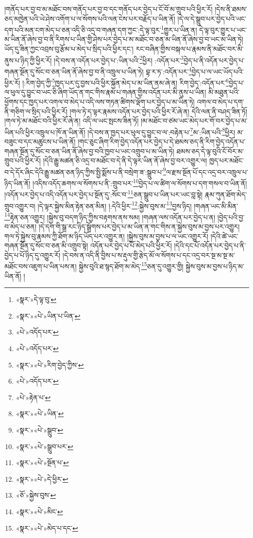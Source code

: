 །གནོད་པར་བྱ་བ་མ་མཐོང་བས་གནོད་པར་བྱ་བ་དང་གནོད་པར་བྱེད་པ་ངོ་བོ་མ་གྲུབ་པའི་ཕྱིར་རོ། །དེས་ནི་ཐམས་ཅད་མཁྱེན་པའི་ཡེ་ཤེས་འགོག་པ་ལ་སོགས་པའི་ལན་ངེས་པར་བརྗོད་པ་ཡིན་ནོ། །དེ་ལ་དེ་སྒྲུབ་པར་བྱེད་པའི་ཡང་དག་པའི་མན་ངག་མེད་པ་ཅན་འདི་ཅི་འདྲ་བ་གཞན་དག་ཀྱང་:དེ་ལྟ་བུར་\footnote{«སྣར་»དེ་ལྟ་བུ་}གྱུར་པ་ཡིན་ན། དེ་ལྟ་བུར་གྱུར་པ་ཡང་མ་ཡིན་ནོ་ཞེས་བྱ་བ་ནི་རིགས་པ་ཡིན་གྱི་ཤེས་པར་བྱེད་པ་མ་མཐོང་བ་ཅན་མ་ཡིན་ནོ་ཞེས་བྱ་བ་ཡང་མ་ཡིན་ཏེ། ཡོད་དུ་ཟིན་ཀྱང་འབྲས་བུ་རྩོམ་པ་མེད་པ་སྲིད་པའི་ཕྱིར་དང་། རང་བཞིན་གྱིས་བསྐལ་པ་རྣམས་ནི་མཐོང་བར་མི་ནུས་པ་ཉིད་ཀྱི་ཕྱིར་རོ། །དེ་བས་ན་འདོན་པར་བྱེད་པ་:ཡིན་པའི་\footnote{«སྣར་»«པེ་»ཡིན་པ་ཡིན་}ཕྱིར། :འདོན་པར་\footnote{«པེ་»འདོད་པར་}བྱེད་པ་ནི་འདོན་པར་བྱེད་པ་གཞན་སྔོན་དུ་སོང་བ་ཅན་ཡིན་ནོ་ཞེས་བྱ་བ་ནི་འཁྲུལ་པ་ཡིན་ཏེ། བྷ་ར་ཏ་:འདོན་པར་\footnote{«པེ་»འདོད་པར་}བྱེད་པ་ལ་ཡང་ཡོད་པའི་ཕྱིར་རོ། །:རིག་བྱེད་ཀྱི་\footnote{«སྣར་»«པེ་»རིག་བྱེད་ཀྱིས་}ཁྱད་པར་དུ་བྱས་པའི་ཕྱིར་སྐྱོན་མེད་པ་མ་ཡིན་ནམ་ཞེ་ན། རིག་བྱེད་:འདོན་པར་\footnote{«པེ་»འདོད་པར་}བྱེད་པ་ལ་ཕུལ་དུ་བྱུང་བ་ཡང་ཅི་ཞིག་ཡོད་ན་གང་གིས་རྣམ་པ་གཞན་གྱིས་འདོན་པར་མི་ནུས་པ་ཡིན། མི་མཐུན་པའི་ཕྱོགས་དང་ཁྱད་པར་འགལ་བ་མེད་པ་འདི་ལས་གཏན་ཚིགས་ལྡོག་པར་བྱེད་པ་མ་ཡིན་ཏེ། འགལ་བ་མེད་པ་དག་ནི་གཅིག་ལ་སྲིད་པའི་ཕྱིར་རོ། །གལ་ཏེ་ད་ལྟར་རྣམས་འདོན་པར་བྱེད་པའི་ཕྱིར་རོ་ཞེ་ན། དེའི་ལན་ནི་བཤད་ཟིན་ཏོ། །གལ་ཏེ་མ་མཐོང་བའི་ཕྱིར་རོ་ཞེ་ན། འདི་ལ་ཡང་སྤངས་ཟིན་ཏོ། །མ་མཐོང་བ་ཙམ་ཡང་མེད་པར་གོ་བར་བྱེད་པ་མ་ཡིན་པའི་ཕྱིར་འཁྲུལ་པ་ཁོ་ན་ཡིན་ནོ། །དེ་བས་ན་ཁྱད་པར་ཕུལ་དུ་བྱུང་བ་ལ་:བརྟེན་པ་\footnote{«པེ་»རྟེན་པ་}མ་:ཡིན་པའི་\footnote{«སྣར་»«པེ་»ཡིན་}ཕྱིར། མ་བཟུང་བ་དང་མཚུངས་པ་ཡིན་ནོ། །གང་ཅུང་ཞིག་རིག་བྱེད་འདོན་པར་བྱེད་པ་དེ་ཐམས་ཅད་ནི་རིག་བྱེད་འདོན་པ་གཞན་སྔོན་དུ་སོང་བ་ཅན་ཡིན་ནོ་ཞེས་བྱ་བའི་ཁྱབ་པ་ཡང་འགྲུབ་པ་མ་ཡིན་ཏེ། ཐམས་ཅད་དེ་ལྟ་བུའི་ངོ་བོར་མ་གྲུབ་པའི་ཕྱིར་རོ། །དེའི་རྒྱུ་མཚན་ཅི་འདྲ་བ་མཐོང་བ་དེ་ནི་དེ་ལྟར་ཡིན་ནོ་ཞེས་བྱ་བར་འགྱུར་ལ། ཁྱད་པར་མཐོང་བ་དེ་དོར་ཞིང་དེའི་རྒྱུ་མཚན་ཅན་ཉིད་ཀྱིས་སྤྱི་སྨོས་པ་ནི་བསྲེག་ཟ་:སྒྲུབ་པ་\footnote{«སྣར་»«པེ་»སྒྲུབ་}ལ་རྫས་སྔོན་པོ་དང་འདྲ་བར་འཁྲུལ་པ་ཉིད་ཡིན་ནོ། །འདིས་འདོད་ཆགས་ལ་སོགས་པ་ནི་:གྲུབ་པར་\footnote{«སྣར་»«པེ་»སྒྲུབ་པར་}བྱེད་པ་ལ་ཚིག་ལ་སོགས་པ་དག་གསལ་བ་ཡིན་ནོ། །འདོན་པར་བྱེད་པ་འདི་འདོན་པར་བྱེད་པ་སྔོན་དུ་:སོང་བ་\footnote{«སྣར་»«པེ་»སྔོན་པ་}ཅན་སྒྲུབ་པ་ཡིན་པར་ཡང་བླ་སྟེ། རྣམ་ཀུན་ཐོག་མེད་གྲུབ་འགྱུར་བ། །དེ་ལྟར་སྐྱེས་མིན་རྟེན་ཅན་མིན། །:དེའི་ཕྱིར་\footnote{«སྣར་»«པེ་»དེ་ཕྱིར་}:སྐྱེས་བུས་མ་\footnote{«ཅོ་»སྐྱེས་བུས་}བྱས་ཉིད། །གཞན་ཡང་མི་མིན་\footnote{«སྣར་»«པེ་»མིང་}རྟེན་ཅན་འགྱུར། །སྐྱེས་བུ་བདག་ཉིད་ཀྱིས་བརྟགས་ནས་སམ། །གཞན་ལས་འདོན་པར་བྱེད་པ་ན། །བྱེད་པའི་བྱ་བ་མེད་པ་ཅན། །དེ་དག་གི་སྒྲ་རང་ཉིད་སྒྲོགས་པར་བྱེད་པ་མ་ཡིན་ན་གང་གིས་ན་སྐྱེས་བུས་མ་བྱས་པར་འགྱུར། གལ་ཏེ་སྐྱེས་བུ་རྣམས་ཀྱི་ཐོག་མ་ཉིད་ཡོད་པར་འགྱུར་ན། །སྐྱེས་བུས་མ་བྱས་པ་ལ་ཡང་འགྱུར་རོ། །དེའི་ཚེ་ཡང་གཞན་སྔོན་དུ་སོང་བ་ཅན་མི་འགྲུབ་སྟེ། འདོན་པར་བྱེད་པ་པོ་མེད་པའི་ཕྱིར་རོ། །དེའི་དང་པོ་འདོན་པར་བྱེད་པ་ནི་བྱེད་པ་པོ་ཉིད་དུ་འགྱུར་རོ། །དེ་བས་ན་འདི་ནི་བྱིས་པ་ས་རྡུལ་གྱི་རྩེད་མོ་ལ་སོགས་པ་དང་འདྲ་བར་སྔ་མ་སྔ་མ་མཐོང་བས་འཇུག་པ་ཡིན་པས་ན། སྐྱེས་བུའི་ཐ་སྙད་ཐོག་མ་མེད་\footnote{«སྣར་»«པེ་»མེད་པ་དང་}ཅན་དུ་འགྱུར་གྱི། སྐྱེས་བུས་མ་བྱས་པ་ཉིད་མ་ཡིན་ནོ། །
